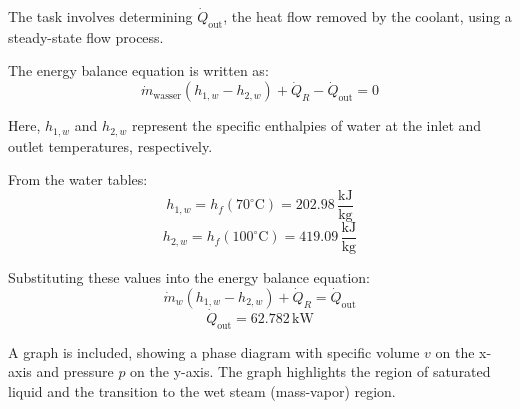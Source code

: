 The task involves determining \( \dot{Q}_{\text{out}} \), the heat flow removed by the coolant, using a steady-state flow process.  

The energy balance equation is written as:  
\[
\dot{m}_{\text{wasser}} (h_{1,w} - h_{2,w}) + \dot{Q}_R - \dot{Q}_{\text{out}} = 0
\]  

Here, \( h_{1,w} \) and \( h_{2,w} \) represent the specific enthalpies of water at the inlet and outlet temperatures, respectively.  

From the water tables:  
\[
h_{1,w} = h_f(70^\circ\text{C}) = 202.98 \, \frac{\text{kJ}}{\text{kg}}
\]  
\[
h_{2,w} = h_f(100^\circ\text{C}) = 419.09 \, \frac{\text{kJ}}{\text{kg}}
\]  

Substituting these values into the energy balance equation:  
\[
\dot{m}_w (h_{1,w} - h_{2,w}) + \dot{Q}_R = \dot{Q}_{\text{out}}
\]  
\[
\dot{Q}_{\text{out}} = 62.782 \, \text{kW}
\]  

A graph is included, showing a phase diagram with specific volume \( v \) on the x-axis and pressure \( p \) on the y-axis. The graph highlights the region of saturated liquid and the transition to the wet steam (mass-vapor) region.